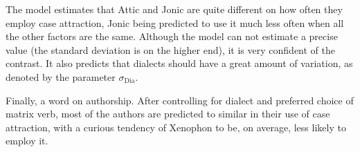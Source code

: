 \documentclass[a4paper, 12pt, article]{memoir}
\begin{document}
The model estimates that Attic and Jonic
are quite different on how often they
employ case attraction, Jonic being predicted to use it much less often when all
the other factors are the same.
Although the model can not estimate a precise value (the standard deviation is
on the higher end), it is very confident of the contrast.
It also predicts that dialects should have a great amount of variation, as
denoted by the parameter $\sigma_\text{Dia}$.

%   
%

Finally, a word on authorship.
After controlling for dialect and preferred choice of matrix verb, most of the
authors are predicted to similar in their use of case attraction, with a curious
tendency of Xenophon to be, on average, less likely to employ it.

%


\renewcommand*{\mkbibnamefamily}[1]{\textsc{#1}}
\printbibliography%
\renewcommand*{\mkbibnamefamily}[1]{#1}
\end{document}
